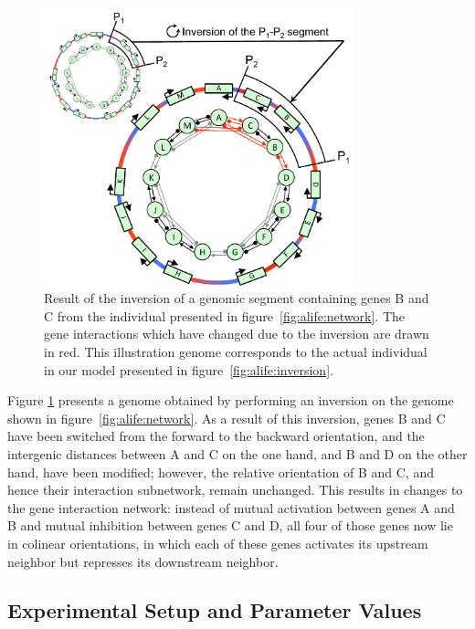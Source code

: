 \begin{figure}[H]
  \centering
  \includegraphics[width=0.8\textwidth]{alife/img/genome_inversion.pdf}
  \caption[Effect of an inversion on the hand-drawn genome in Figure \ref{fig:alife:network}]{Result of the inversion of a genomic segment containing genes B and C from the individual presented in figure~\ref{fig:alife:network}.
  The gene interactions which have changed due to the inversion are drawn in red.
  This illustration genome corresponds to the actual individual in our model presented in figure~\ref{fig:alife:inversion}.}
  \label{fig:alife:genome_inv}
\end{figure}

Figure \ref{fig:alife:genome_inv} presents a genome obtained by performing an inversion on the genome shown in figure~\ref{fig:alife:network}.
As a result of this inversion, genes B and C have been switched from the forward to the backward orientation, and the intergenic distances between A and C on the one hand, and B and D on the other hand, have been modified; however, the relative orientation of B and C, and hence their interaction subnetwork, remain unchanged.
This results in changes to the gene interaction network: instead of mutual activation between genes A and B and mutual inhibition between genes C and D, all four of those genes now lie in colinear orientations, in which each of these genes activates its upstream neighbor but represses its downstream neighbor.

\subsection{Experimental Setup and Parameter Values}

